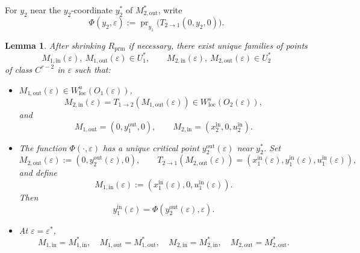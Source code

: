 \documentclass[11pt,a4paper]{article}
\theoremstyle{plain}
\newtheorem{lemma}[theorem]{Lemma}
\theoremstyle{definition}
\theoremstyle{plain}
\numberwithin{equation}{section}
\begin{document}
For $y_2$ near the $y_2$-coordinate $y_2^*$ of $M_{2,\mathrm{out}}^*$, write
\[
\Phi(y_2,\varepsilon)
:=
\operatorname{pr}_{y_1}\bigl(T_{2 \to 1}(0,y_2,0)\bigr).
\]

\begin{lemma}
\label{lem-Ms}
After shrinking $R_\mathrm{prm}$ if necessary, there exist unique families of points
\[
M_{1,\mathrm{in}}(\varepsilon),\ M_{1,\mathrm{out}}(\varepsilon) \in U_1^*,
\qquad
M_{2,\mathrm{in}}(\varepsilon),\ M_{2,\mathrm{out}}(\varepsilon) \in U_2^*
\]
of class $C^{r-2}$ in $\varepsilon$ such that:
\begin{itemize}
\item $M_{1,\mathrm{out}}(\varepsilon) \in W^u_\mathrm{loc}(O_1(\varepsilon))$,
\[
M_{2,\mathrm{in}}(\varepsilon) = T_{1 \to 2}(M_{1,\mathrm{out}}(\varepsilon)) \in W^s_\mathrm{loc}(O_2(\varepsilon)),
\]
and
\[
M_{1,\mathrm{out}} = (0,y_1^\mathrm{out},0),
\qquad
M_{2,\mathrm{in}} = (x_2^\mathrm{in},0,u_2^\mathrm{in}).
\]
\item The function $\Phi(\cdot,\varepsilon)$ has a unique critical point $y_2^\mathrm{out}(\varepsilon)$ near $y_2^*$. Set
\[
M_{2,\mathrm{out}}(\varepsilon) := (0,y_2^\mathrm{out}(\varepsilon),0),
\qquad
T_{2 \to 1}(M_{2,\mathrm{out}}(\varepsilon)) = (x_1^\mathrm{in}(\varepsilon),y_1^\mathrm{in}(\varepsilon),u_1^\mathrm{in}(\varepsilon)),
\]
and define
\[
M_{1,\mathrm{in}}(\varepsilon) := (x_1^\mathrm{in}(\varepsilon),0,u_1^\mathrm{in}(\varepsilon)).
\]
Then
\[
y_1^\mathrm{in}(\varepsilon) = \Phi(y_2^\mathrm{out}(\varepsilon),\varepsilon).
\]
\item At $\varepsilon = \varepsilon^*$,
\[
M_{1,\mathrm{in}} = M_{1,\mathrm{in}}^*,
\quad
M_{1,\mathrm{out}} = M_{1,\mathrm{out}}^*,
\quad
M_{2,\mathrm{in}} = M_{2,\mathrm{in}}^*,
\quad
M_{2,\mathrm{out}} = M_{2,\mathrm{out}}^*.
\]
\end{itemize}
\end{lemma}
\end{document}
